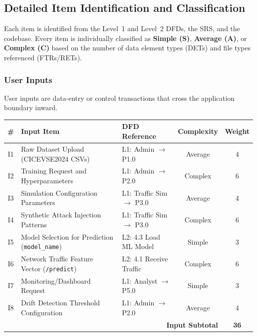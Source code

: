 \documentclass[11pt, a4paper]{article}
\begin{document}
\newpage
\subsection{Detailed Item Identification and Classification}

Each item is identified from the Level~1 and Level~2 DFDs, the SRS, and the codebase. Every item is individually classified as \textbf{Simple (S)}, \textbf{Average (A)}, or \textbf{Complex (C)} based on the number of data element types (DETs) and file types referenced (FTRs/RETs).

\subsubsection{User Inputs}
User inputs are data-entry or control transactions that cross the application boundary inward.

\begin{center}
\begin{tabular}{|c|l|l|c|c|}
\hline
\textbf{\#} & \textbf{Input Item} & \textbf{DFD Reference} & \textbf{Complexity} & \textbf{Weight} \\ \hline
I1 & Raw Dataset Upload (CICEVSE2024 CSVs)            & L1: Admin $\to$ P1.0           & Average  & 4 \\ \hline
I2 & Training Request and Hyperparameters              & L1: Admin $\to$ P2.0           & Complex  & 6 \\ \hline
I3 & Simulation Configuration Parameters               & L1: Traffic Sim $\to$ P3.0     & Average  & 4 \\ \hline
I4 & Synthetic Attack Injection Patterns                & L1: Traffic Sim $\to$ P3.0     & Complex  & 6 \\ \hline
I5 & Model Selection for Prediction (\texttt{model\_name})  & L2: 4.3 Load ML Model     & Simple   & 3 \\ \hline
I6 & Network Traffic Feature Vector (\texttt{/predict})     & L2: 4.1 Receive Traffic    & Complex  & 6 \\ \hline
I7 & Monitoring/Dashboard Request                       & L1: Analyst $\to$ P5.0         & Simple   & 3 \\ \hline
I8 & Drift Detection Threshold Configuration            & L1: Admin $\to$ P2.0           & Average  & 4 \\ \hline
\multicolumn{4}{|r|}{\textbf{Input Subtotal}} & \textbf{36} \\ \hline
\end{tabular}
\end{center}
\end{document}
